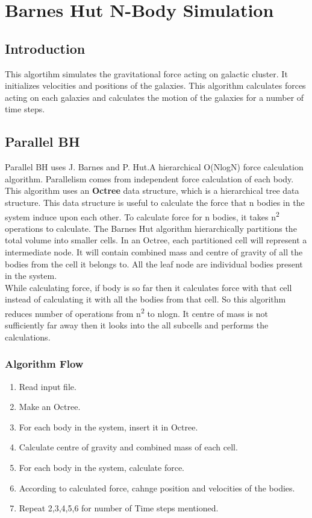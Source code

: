 \documentclass{article}
\begin{document}

\section{Barnes Hut N-Body Simulation}

\subsection{Introduction}
This algortihm simulates the gravitational force acting on galactic cluster. It initializes velocities and positions of the galaxies. This algorithm calculates forces acting on each galaxies and calculates the motion of the galaxies for a number of time steps.

\subsection{Parallel BH}
Parallel BH uses J. Barnes and P. Hut.A hierarchical O(NlogN) force calculation algorithm. Parallelism comes from independent force calculation of each body. This algorithm uses an \textbf{Octree} data structure, which is a hierarchical tree data structure. This data structure is useful to calculate the force that n bodies in the system induce upon each other. To calculate force for n bodies, it takes n\textsuperscript{2} operations to calculate. The Barnes Hut algorithm hierarchically partitions the total volume into smaller cells. In an Octree, each partitioned cell will represent a intermediate node. It will contain combined mass and centre of gravity of all the bodies from the cell it belongs to. All the leaf node are individual bodies present in the system. \\

While calculating force, if body is so far then it calculates force with that cell instead of calculating it with all the bodies from that cell. So this algorithm reduces number of operations from n\textsuperscript{2} to nlogn. It centre of mass is not sufficiently far away then it looks into the all subcells and performs the calculations.    

\subsubsection{Algorithm Flow}
\begin{enumerate}
\item Read input file.
\item Make an Octree.
\item For each body in the system, insert it in Octree.
\item Calculate centre of gravity and combined mass of each cell.
\item For each body in the system, calculate force.
\item According to calculated force, cahnge position and velocities of the bodies.
\item Repeat 2,3,4,5,6 for number of Time steps mentioned.
\end{enumerate}
\end{document}
